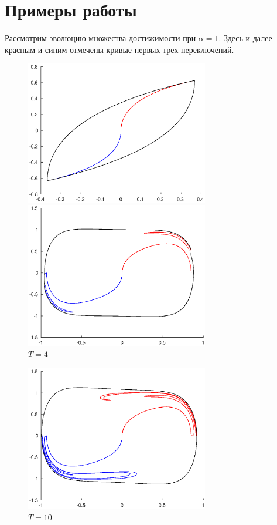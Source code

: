 \documentclass[16pt]{article}
\begin{document}
\section{Примеры работы}
Рассмотрим эволюцию множества достижимости при $\alpha = 1$. Здесь и далее красным и синим отмечены кривые
первых трех переключений.


\begin{figure}[h]
\begin{multicols}{2}
	\hfill
\includegraphics[width=80mm]{1_1.eps}
	\hfill
\caption{$T = 1$}
	\hfill
\includegraphics[width=80mm]{4_1.eps}
	\hfill
\caption{$T = 4$}
    \hfill
\end{multicols}
\end{figure}



\begin{figure}[h]
\center
\includegraphics[width=80mm]{10_1.eps}
\caption{$T = 10$}
\end{figure}
\newpage
\end{document}
